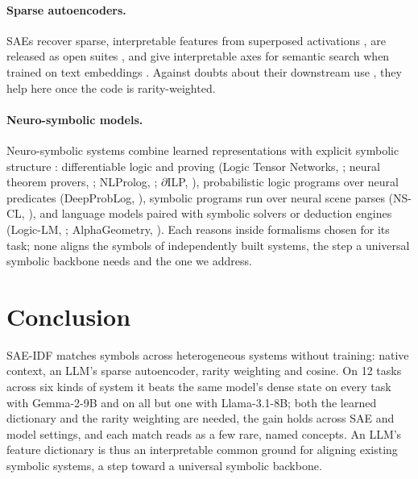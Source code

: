 \documentclass[11pt]{article}
\newcommand{\method}{SAE\mbox{-}IDF\xspace}
\begin{document}
\paragraph{Sparse autoencoders.}
SAEs recover sparse, interpretable features from superposed activations \citep{elhage2022toy, bricken2023monosemanticity, cunningham2024sparse, templeton2024scaling, gao2025scaling}, are released as open suites \citep{lieberum2024gemmascope, he2024llamascope}, and give interpretable axes for semantic search when trained on text embeddings \citep{oneill2024disentangling}.
Against doubts about their downstream use \citep{kantamneni2025sparse}, they help here once the code is rarity-weighted.

\paragraph{Neuro-symbolic models.}
Neuro-symbolic systems combine learned representations with explicit symbolic structure \citep{kautz2022third}: differentiable logic and proving (Logic Tensor Networks, \citealp{badreddine2022ltn}; neural theorem provers, \citealp{rocktaschel2017ntp}; NLProlog, \citealp{weber2019nlprolog}; $\partial$ILP, \citealp{evans2018dilp}), probabilistic logic programs over neural predicates (DeepProbLog, \citealp{manhaeve2018deepproblog}), symbolic programs run over neural scene parses (NS-CL, \citealp{mao2019nscl}), and language models paired with symbolic solvers or deduction engines (Logic-LM, \citealp{pan2023logiclm}; AlphaGeometry, \citealp{trinh2024alphageometry}).
Each reasons inside formalisms chosen for its task; none aligns the symbols of independently built systems, the step a universal symbolic backbone needs \citep{yang2026generative} and the one we address.

\section{Conclusion}
\label{sec:conclusion}

\method matches symbols across heterogeneous systems without training: native context, an LLM's sparse autoencoder, rarity weighting and cosine.
On 12 tasks across six kinds of system it beats the same model's dense state on every task with Gemma-2-9B and on all but one with Llama-3.1-8B; both the learned dictionary and the rarity weighting are needed, the gain holds across SAE and model settings, and each match reads as a few rare, named concepts.
An LLM's feature dictionary is thus an interpretable common ground for aligning existing symbolic systems, a step toward a universal symbolic backbone.
\end{document}
